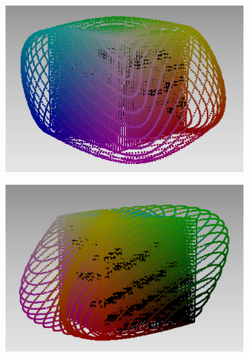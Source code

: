 \begin{figure}[t!]
	\centering
	\captionsetup[subfigure]{font=footnotesize,labelfont=footnotesize}
	\captionsetup[subfigure]{justification=centering}
	\begin{subfigure}[t]{0.22\textwidth}
		\includegraphics[width=\linewidth]{img/seededCube_mcb1.png}
		\label{fig:seededCube_mcb1}
	\end{subfigure} \hspace{0.05em}
	\begin{subfigure}[t]{0.22\textwidth}
		\includegraphics[width=\linewidth]{img/seededCube_mcb2.png}
		\label{fig:seededCube_mcb2}
	\end{subfigure} \hspace{0.05em}
	\begin{subfigure}[t]{0.22\textwidth}

\end{subfigure}
\end{figure}
